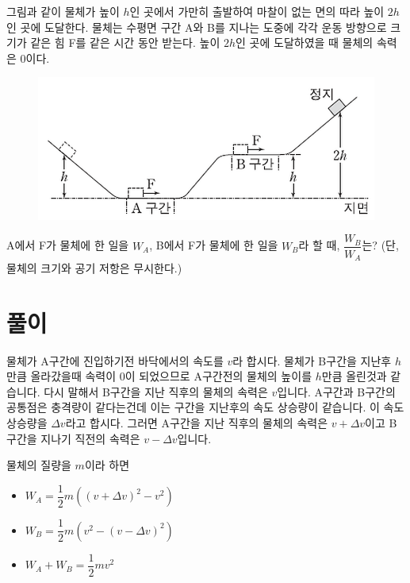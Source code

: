 \documentclass{oblivoir}
\begin{document}
그림과 같이 물체가 높이 $h$인 곳에서 가만히 출발하여 마찰이 없는 면의 따라 높이 $2h$인 곳에 도달한다. 물체는 수평면 구간 A와 B를 지나는 도중에 각각 운동 방향으로 크기가 같은 힘 F를 같은 시간 동안 받는다. 높이 $2h$인 곳에 도달하였을 때 물체의 속력은 0이다. 

\begin{figure}[h!]
    \centering
    \includegraphics[scale=0.5]{170920.png}
\end{figure}

A에서 F가 물체에 한 일을 $W_A$, B에서 F가 물체에 한 일을 $W_B$라 할 때, $\dfrac{W_B}{W_A}$는? (단, 물체의 크기와 공기 저항은 무시한다.)

\section{풀이}
물체가 A구간에 진입하기전 바닥에서의 속도를 $v$라 합시다.
물체가 B구간을 지난후 $h$만큼 올라갔을때 속력이 0이 되었으므로 A구간전의 물체의 높이를 $h$만큼 올린것과 같습니다. 다시 말해서 B구간을 지난 직후의 물체의 속력은 $v$입니다. A구간과 B구간의 공통점은 충격량이 같다는건데 이는 구간을 지난후의 속도 상승량이 같습니다. 이 속도 상승량을 $\Delta v$라고 합시다. 그러면 A구간을 지난 직후의 물체의 속력은 $v+\Delta v$이고 B구간을 지나기 직전의 속력은 $v-\Delta v$입니다. 

물체의 질량을 $m$이라 하면 

\begin{itemize}
    \item $W_A=\dfrac{1}{2}m((v+\Delta v)^2-v^2)$ 
    \item $W_B = \dfrac{1}{2}m(v^2-(v-\Delta v)^2)$
    \item $W_A + W_B = \dfrac{1}{2}m v^2$
\end{itemize}
\end{document}
